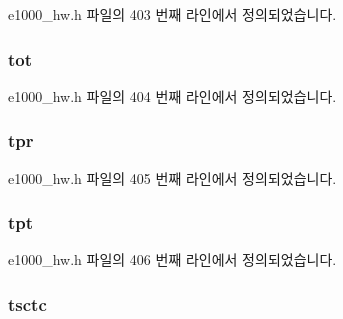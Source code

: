 e1000\+\_\+hw.\+h 파일의 403 번째 라인에서 정의되었습니다.

\subsubsection[{\texorpdfstring{tot}{tot}}]{ tot}\hypertarget{structe1000__hw__stats_ac4792034ec4a70754e35498ad5abe6bd}{}\label{structe1000__hw__stats_ac4792034ec4a70754e35498ad5abe6bd}


e1000\+\_\+hw.\+h 파일의 404 번째 라인에서 정의되었습니다.

\subsubsection[{\texorpdfstring{tpr}{tpr}}]{ tpr}\hypertarget{structe1000__hw__stats_a0425907fec8d9ea68808d9cc1e81fae6}{}\label{structe1000__hw__stats_a0425907fec8d9ea68808d9cc1e81fae6}


e1000\+\_\+hw.\+h 파일의 405 번째 라인에서 정의되었습니다.

\subsubsection[{\texorpdfstring{tpt}{tpt}}]{ tpt}\hypertarget{structe1000__hw__stats_a40f5726ff7ad05027cbb76f5f4e8bb86}{}\label{structe1000__hw__stats_a40f5726ff7ad05027cbb76f5f4e8bb86}


e1000\+\_\+hw.\+h 파일의 406 번째 라인에서 정의되었습니다.

\subsubsection[{\texorpdfstring{tsctc}{tsctc}}]{ tsctc}\hypertarget{structe1000__hw__stats_a8ed5e76020600dad05e5d54c1ce9295d}{}\label{structe1000__hw__stats_a8ed5e76020600dad05e5d54c1ce9295d}


